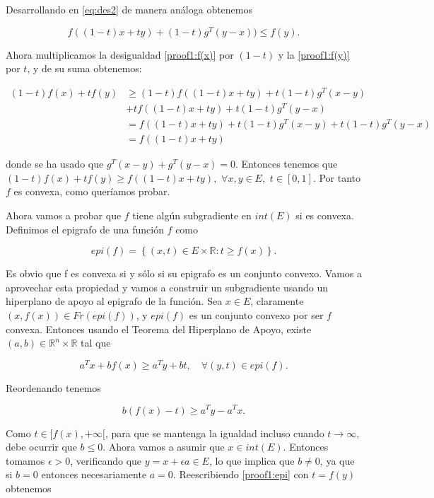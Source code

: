 Desarrollando en \ref{eq:des2} de manera análoga obtenemos

\begin{equation}\label{proof1:f(y)}
    f((1-t)x + ty) + (1-t)g^T(y-x)) \leq f(y).
\end{equation}

Ahora multiplicamos la desigualdad \ref{proof1:f(x)} por $(1-t)$ y la \ref{proof1:f(y)} por $t$, y de su suma obtenemos:

\begin{align*}
	(1-t)f(x) + tf(y) &\geq  (1-t)f((1-t)x+ty) + t(1-t)g^T(x-y) \\
	&+ tf((1-t)x+ty) + t(1-t)g^T(y-x) \\
	 &= f((1-t)x + ty) + t(1-t) g^T(x-y) + t(1-t)g^T(y-x) \\
	&= f((1-t)x+ty)
\end{align*}

donde se ha usado que $g^T(x-y) + g^T(y-x)=0$. Entonces tenemos que $(1-t)f(x) + tf(y) \geq f((1-t)x + ty), $ $ \forall x,y \in E, $ $ t \in [0,1]$. Por tanto $f$ es convexa, como queríamos probar.

Ahora vamos a probar que $f$ tiene algún subgradiente en $int(E)$ si es convexa. Definimos el epigrafo de una función $f$ como

 $$epi(f)=\left \{ (x,t) \in E \times \mathbb{R} : t \geq f(x) \right \}.$$

Es obvio que f es convexa si y sólo si su epigrafo es un conjunto convexo. Vamos a aprovechar esta propiedad y vamos a construir un subgradiente usando un hiperplano de apoyo al epigrafo de la función. Sea $x \in E$, claramente $(x, f(x)) \in Fr(epi(f))$, y $epi(f)$ es un conjunto convexo por ser $f$ convexa. Entonces usando el Teorema del Hiperplano de Apoyo, existe $(a,b) \in \mathbb{R}^n \times \mathbb{R}$ tal que

\begin{equation}\label{proof1:epi}
    a^Tx + bf(x) \geq a^Ty + bt, \quad \forall (y,t) \in epi(f).
\end{equation}

Reordenando tenemos

$$b(f(x)-t) \geq a^Ty - a^Tx.$$

Como $t \in [f(x), + \infty [$, para que se mantenga la igualdad incluso cuando $t \rightarrow \infty$, debe ocurrir que $b\leq 0$. Ahora vamos a asumir que $x \in int(E)$. Entonces tomamos $\epsilon > 0$, verificando que $y=x+\epsilon a \in E$, lo que implica que $b\neq 0$, ya que si $b=0$ entonces necesariamente $a=0$. Reescribiendo \ref{proof1:epi} con $t=f(y)$ obtenemos

